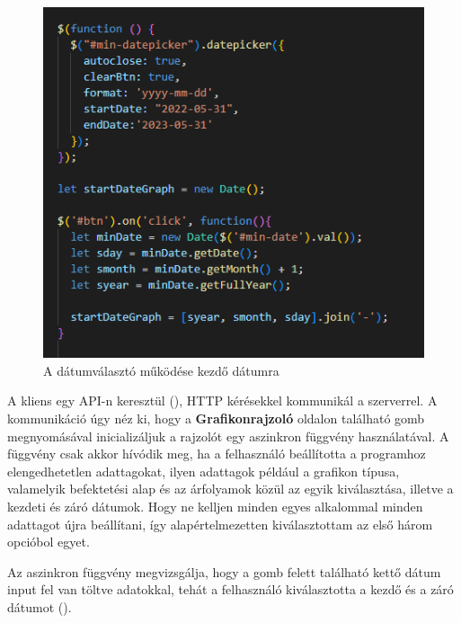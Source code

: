 \begin{figure}[h]
\centering
\includegraphics[scale=0.7]{images/datepicker.png}
\caption{A dátumválasztó működése kezdő dátumra}
\label{fig:datepicker}
\end{figure}

\pagebreak

A kliens egy API-n keresztül (), HTTP kérésekkel kommunikál a szerverrel. A kommunikáció úgy néz ki, hogy a \textbf{Grafikonrajzoló} oldalon található gomb megnyomásával inicializáljuk a rajzolót egy aszinkron függvény használatával. A függvény csak akkor hívódik meg, ha a felhasználó beállította a programhoz elengedhetetlen adattagokat, ilyen adattagok például a grafikon típusa, valamelyik befektetési alap és az árfolyamok közül az egyik kiválasztása, illetve a kezdeti és záró dátumok. Hogy ne kelljen minden egyes alkalommal minden adattagot újra beállítani, így alapértelmezetten kiválasztottam az első három opcióbol egyet.
	
	Az aszinkron függvény megvizsgálja, hogy a gomb felett található kettő dátum input fel van töltve adatokkal, tehát a felhasználó kiválasztotta a kezdő és a záró dátumot ().


